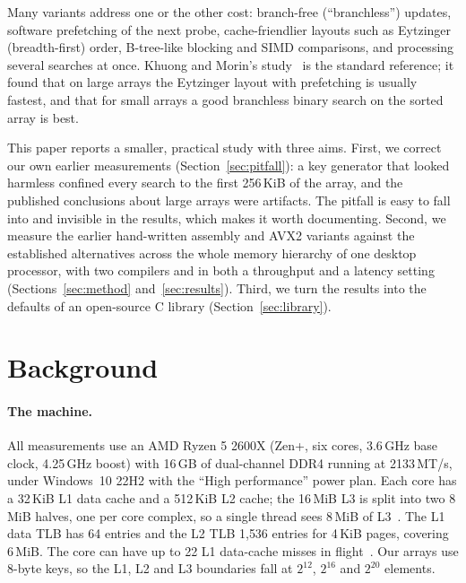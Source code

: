 \documentclass[11pt]{article}
\begin{document}
Many variants address one or the other cost: branch-free (``branchless'')
updates, software prefetching of the next probe, cache-friendlier layouts such
as Eytzinger (breadth-first) order, B-tree-like blocking and SIMD comparisons,
and processing several searches at once. Khuong and Morin's
study~\cite{khuong2017layouts} is the standard reference; it found that on
large arrays the Eytzinger layout with prefetching is usually fastest, and that
for small arrays a good branchless binary search on the sorted array is best.

This paper reports a smaller, practical study with three aims. First, we
correct our own earlier measurements (Section~\ref{sec:pitfall}): a key
generator that looked harmless confined every search to the first 256\,KiB of
the array, and the published conclusions about large arrays were artifacts.
The pitfall is easy to fall into and invisible in the results, which makes it
worth documenting. Second, we measure the earlier hand-written assembly and
AVX2 variants against the established alternatives across the whole memory
hierarchy of one desktop processor, with two compilers and in both a throughput
and a latency setting (Sections~\ref{sec:method} and~\ref{sec:results}).
Third, we turn the results into the defaults of an open-source C library
(Section~\ref{sec:library}).

\section{Background}\label{sec:background}

\paragraph{The machine.} All measurements use an AMD Ryzen 5 2600X (Zen+, six
cores, 3.6\,GHz base clock, 4.25\,GHz boost) with 16\,GB of dual-channel DDR4
running at 2133\,MT/s, under Windows~10 22H2 with the ``High performance''
power plan. Each core has a 32\,KiB L1 data cache and a 512\,KiB L2 cache; the
16\,MiB L3 is split into two 8\,MiB halves, one per core complex, so a single
thread sees 8\,MiB of L3~\cite{sevencpu-zen}. The L1 data TLB has 64 entries and
the L2 TLB 1{,}536 entries for 4\,KiB pages, covering 6\,MiB. The core can have
up to 22 L1 data-cache misses in flight~\cite{sevencpu-zen}. Our arrays use 8-byte
keys, so the L1, L2 and L3 boundaries fall at $2^{12}$, $2^{16}$ and $2^{20}$
elements.
\end{document}
